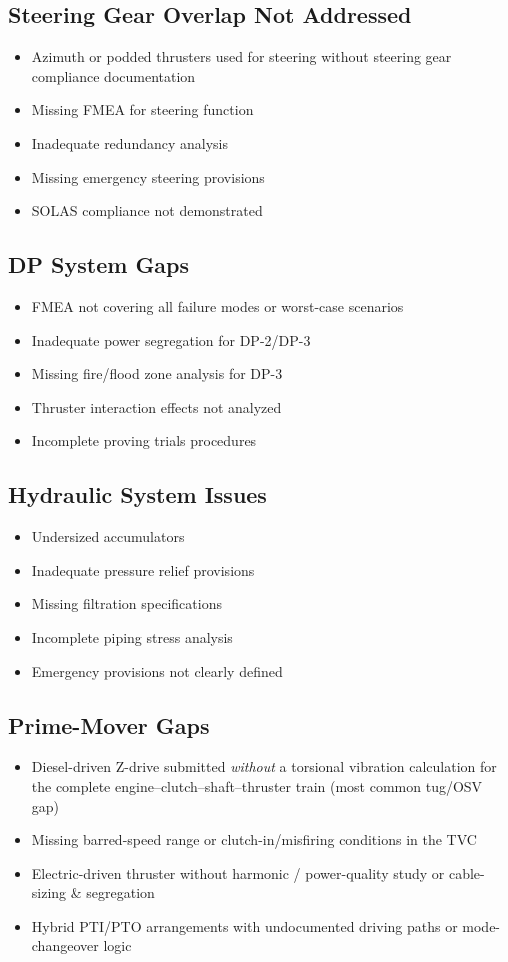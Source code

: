 \documentclass[11pt,a4paper]{report}
\begin{document}
\subsection{Steering Gear Overlap Not Addressed}
\begin{itemize}[leftmargin=*]
\item Azimuth or podded thrusters used for steering without steering gear compliance documentation
\item Missing FMEA for steering function
\item Inadequate redundancy analysis
\item Missing emergency steering provisions
\item SOLAS compliance not demonstrated
\end{itemize}

\subsection{DP System Gaps}
\begin{itemize}[leftmargin=*]
\item FMEA not covering all failure modes or worst-case scenarios
\item Inadequate power segregation for DP-2/DP-3
\item Missing fire/flood zone analysis for DP-3
\item Thruster interaction effects not analyzed
\item Incomplete proving trials procedures
\end{itemize}

\subsection{Hydraulic System Issues}
\begin{itemize}[leftmargin=*]
\item Undersized accumulators
\item Inadequate pressure relief provisions
\item Missing filtration specifications
\item Incomplete piping stress analysis
\item Emergency provisions not clearly defined
\end{itemize}

\subsection{Prime-Mover Gaps}
\begin{itemize}[leftmargin=*]
\item Diesel-driven Z-drive submitted \emph{without} a torsional vibration calculation for the complete engine--clutch--shaft--thruster train (most common tug/OSV gap)
\item Missing barred-speed range or clutch-in/misfiring conditions in the TVC
\item Electric-driven thruster without harmonic / power-quality study or cable-sizing \& segregation
\item Hybrid PTI/PTO arrangements with undocumented driving paths or mode-changeover logic
\end{itemize}
\end{document}

